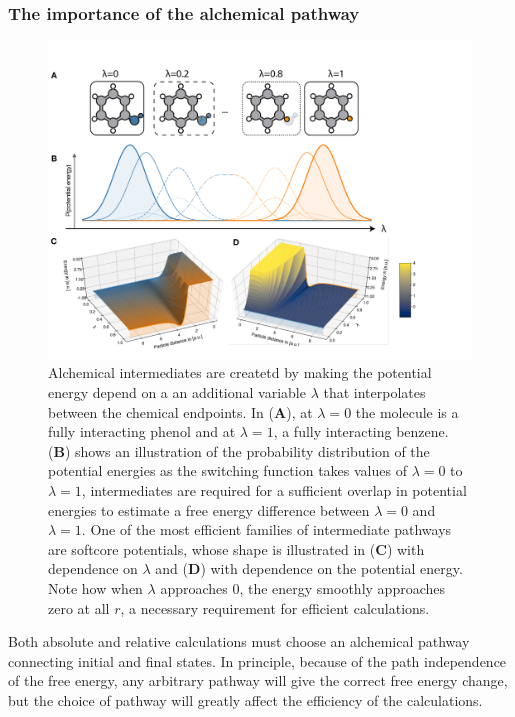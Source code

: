 \documentclass[9pt,bestpractices]{livecoms}
\begin{document}
\subsubsection{The importance of the alchemical pathway
\label{sec:important_path}}
\begin{figure}
    \includegraphics[width=0.95\linewidth]{figures/fig7_what_is_lam/Figure.pdf}
    \caption{Alchemical intermediates are createtd by making the potential energy depend on a an additional variable $\lambda$ that interpolates between the chemical endpoints. In (\textbf{A}), at $\lambda=0$ the molecule is a fully interacting phenol and at $\lambda=1$,  a fully interacting benzene. (\textbf{B}) shows an illustration of the probability distribution of the potential energies as the switching function takes values of $\lambda=0$ to $\lambda=1$, intermediates are required for a sufficient overlap in potential energies to estimate a free energy difference between $\lambda=0$ and $\lambda=1$.
    One of the most efficient families of intermediate pathways  are softcore potentials, whose shape is illustrated in (\textbf{C}) with dependence on $\lambda$ and (\textbf{D}) with dependence on the potential energy. Note how when $\lambda$ approaches 0, the energy smoothly approaches zero at all $r$, a necessary requirement for efficient calculations.  }
    \label{fig:fig_what_is_lambda}
\end{figure}
%
Both absolute and relative calculations must choose an alchemical pathway connecting initial and final states. In principle, because of the path independence of the free energy, any arbitrary pathway will give the correct free energy change, but the choice of pathway will greatly affect the efficiency of the calculations. 
\end{document}
